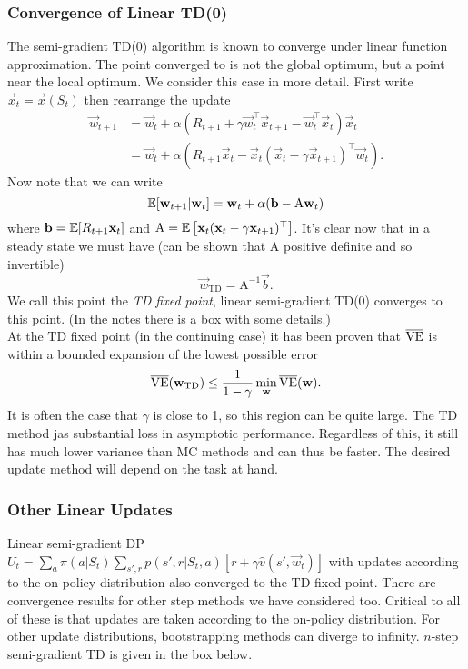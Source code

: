 \subsubsection*{Convergence of Linear TD(0)}
The semi-gradient TD(0) algorithm is known to converge under linear function approximation. The point converged to is not the global optimum, but a point near the local optimum. We consider this case in more detail. First write $\vec{x}_t = \vec{x}(S_t)$ then rearrange the update
\begin{align}
    \vec{w}_{t+1} &= \vec{w}_t + \alpha \left(R_{t+1} + \gamma \vec{w}_t^\top \vec{x}_{t+1} - \vec{w}_{t}^\top \vec{x}_t\right)\vec{x}_t \\
                  &= \vec{w}_t + \alpha \left(R_{t+1}\vec{x}_t - \vec{x}_t(\vec{x}_t -  \gamma\vec{x}_{t+1})^\top\vec{w}_t\right).
\end{align}
Now note that we can write
\[
    \mathbb{E}{}[\mathbf{w}_{t+1} \vert{} \mathbf{w}_t] = \mathbf{w}_t + \alpha (\mathbf{b} - \mathrm{A}\mathbf{w}_t)
\]
where $\mathbf{b} = \mathbb{E}{}[R_{t+1}\mathbf{x}_t]$ and $\mathrm{A} = \mathbb{E}{}\left[\mathbf{x}_t(\mathbf{x}_t - \gamma\mathbf{x}_{t+1})^\top\right]$. It's clear now that in a steady state we must have (can be shown that $\mathrm{A}$ positive definite and so invertible)
\[
    \vec{w}_{\text{TD}} = \mathrm{A}^{-1}\vec{b}.
\]
We call this point the \emph{TD fixed point}, linear semi-gradient TD(0) converges to this point. (In the notes there is a box with some details.)\\

At the TD fixed point (in the continuing case) it has been proven that $\overline{\mathrm{VE}}$ is within a bounded expansion of the lowest possible error
\begin{equation}
    \overline{\mathrm{VE}}(\mathbf{w}_{\text{TD}}) \leq \frac{1}{1 - \gamma} \min_{\mathbf{w}} \overline{\mathrm{VE}}(\mathbf{w}).
\end{equation}
It is often the case that $\gamma$ is close to 1, so this region can be quite large. The TD method jas substantial loss in asymptotic performance. Regardless of this, it still has much lower variance than MC methods and can thus be faster. The desired update method will depend on the task at hand.\\

\subsubsection*{Other Linear Updates}
Linear semi-gradient DP $U_t = \sum_a \pi(a \vert{} S_t) \sum_{s', r} p(s', r \vert{} S_t, a) [r + \gamma \hat{v}(s', \vec{w}_t)]$ with updates according to the on-policy distribution also converged to the TD fixed point. There are convergence results for other step methods we have considered too. Critical to all of these is that updates are taken according to the on-policy distribution. For other update distributions, bootstrapping methods can diverge to infinity. $n$-step semi-gradient TD is given in the box below.\\

